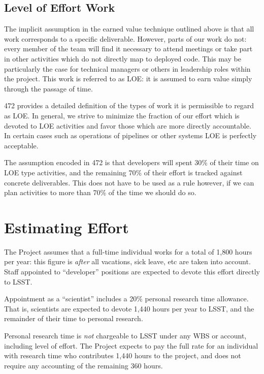 \subsection{Level of Effort Work}\label{level-of-effort-work}

The implicit assumption in the earned value technique outlined above is
that all work corresponds to a specific deliverable. However, parts of
our work do not: every member of the team will find it necessary to
attend meetings or take part in other activities which do not directly
map to deployed code. This may be particularly the case for technical
managers or others in leadership roles within the project. This work is
referred to as LOE: it is assumed to earn value simply through the
passage of time.

472 provides a detailed definition of the types of work it is
permissible to regard as LOE. In general, we strive to minimize the
fraction of our effort which is devoted to LOE activities and favor
those which are more directly accountable. In certain cases such as
operations of pipelines or other systems LOE is perfectly acceptable.

The assumption encoded in 472 is that developers will spent 30\% of
their time on LOE type activities, and the remaining 70\% of their
effort is tracked against concrete deliverables. This does not have to
be used as a rule however, if we can plan activities to more than 70\%
of the time we should do so.

\section{Estimating Effort}\label{estimating-effort}

The Project assumes that a full-time individual works for a total of
1,800 hours per year: this figure is \emph{after} all vacations, sick
leave, etc are taken into account. Staff appointed to ``developer''
positions are expected to devote this effort directly to LSST.

Appointment as a ``scientist'' includes a 20\% personal research time
allowance. That is, scientists are expected to devote 1,440 hours per
year to LSST, and the remainder of their time to personal research.

Personal research time is \emph{not} chargeable to LSST under any WBS or
account, including level of effort. The Project expects to pay the full
rate for an individual with research time who contributes 1,440 hours to
the project, and does not require any accounting of the remaining 360
hours.

